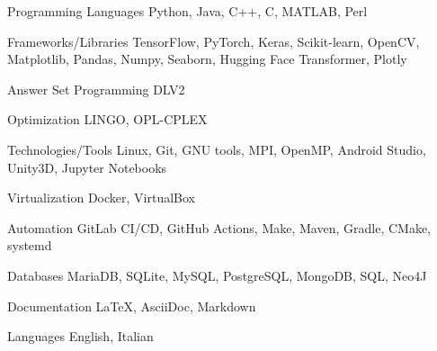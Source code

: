 

\begin{cvskills}

    \cvskill
    {Programming Languages}
    {Python, Java, C++, C, MATLAB, Perl}

    
    \cvskill
    {Frameworks/Libraries}
    {TensorFlow, PyTorch, Keras, Scikit-learn, OpenCV, Matplotlib, Pandas, Numpy, Seaborn, Hugging Face Transformer, Plotly}

    \cvskill
    {Answer Set Programming} %
    {DLV2} %

    \cvskill
    {Optimization} %
    {LINGO, OPL-CPLEX} %

    \cvskill
    {Technologies/Tools}
    {Linux, Git, GNU tools, MPI, OpenMP, Android Studio, Unity3D, Jupyter Notebooks}
    
    \cvskill
    {Virtualization}
    {Docker, VirtualBox}
    
    \cvskill
    {Automation}
    {GitLab CI/CD, GitHub Actions, Make, Maven, Gradle, CMake, systemd}
    
    \cvskill
    {Databases}
    {MariaDB, SQLite, MySQL, PostgreSQL, MongoDB, SQL, Neo4J}
    
    \cvskill
    {Documentation}
    {\LaTeX, AsciiDoc, Markdown}
    
    \cvskill
    {Languages} %
    {English, Italian} %

\end{cvskills}
